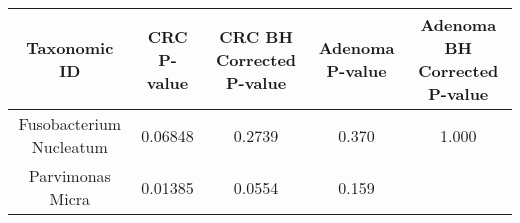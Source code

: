\documentclass[12pt,]{article}
\begin{document}
\begin{longtable}[]{@{}ccccc@{}}
\toprule
\begin{minipage}[b]{0.24\columnwidth}\centering\strut
Taxonomic ID\strut
\end{minipage} & \begin{minipage}[b]{0.10\columnwidth}\centering\strut
CRC P-value\strut
\end{minipage} & \begin{minipage}[b]{0.18\columnwidth}\centering\strut
CRC BH Corrected P-value\strut
\end{minipage} & \begin{minipage}[b]{0.13\columnwidth}\centering\strut
Adenoma P-value\strut
\end{minipage} & \begin{minipage}[b]{0.21\columnwidth}\centering\strut
Adenoma BH Corrected P-value\strut
\end{minipage}\tabularnewline
\midrule
\endhead
\begin{minipage}[t]{0.24\columnwidth}\centering\strut
Fusobacterium Nucleatum\strut
\end{minipage} & \begin{minipage}[t]{0.10\columnwidth}\centering\strut
0.06848\strut
\end{minipage} & \begin{minipage}[t]{0.18\columnwidth}\centering\strut
0.2739\strut
\end{minipage} & \begin{minipage}[t]{0.13\columnwidth}\centering\strut
0.370\strut
\end{minipage} & \begin{minipage}[t]{0.21\columnwidth}\centering\strut
1.000\strut
\end{minipage}\tabularnewline
\begin{minipage}[t]{0.24\columnwidth}\centering\strut
Parvimonas Micra\strut
\end{minipage} & \begin{minipage}[t]{0.10\columnwidth}\centering\strut
0.01385\strut
\end{minipage} & \begin{minipage}[t]{0.18\columnwidth}\centering\strut
0.0554\strut
\end{minipage} & \begin{minipage}[t]{0.13\columnwidth}\centering\strut
0.159\strut
\end{minipage} & \begin{minipage}[t]{0.21\columnwidth}\centering\strut

\end{minipage}
\end{longtable}
\end{document}
